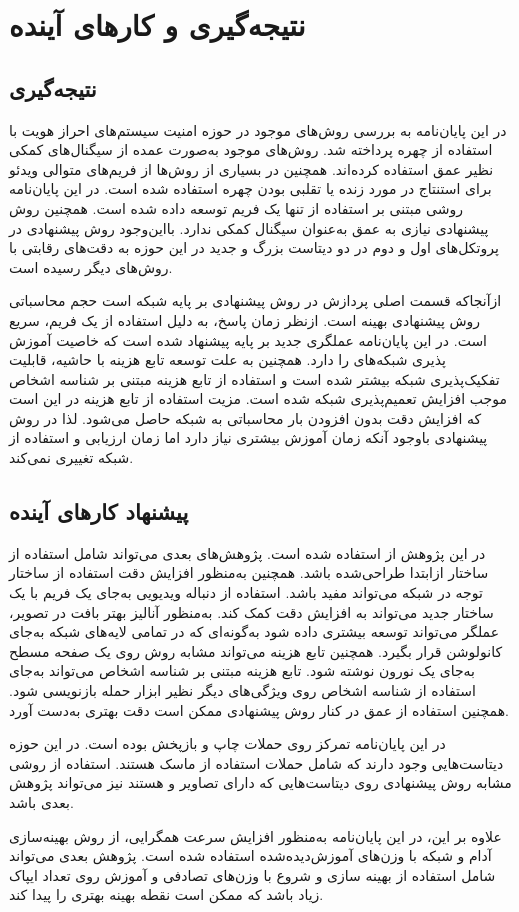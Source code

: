 \chapter{نتیجه‌گیری و کارهای آینده}
\section{نتیجه‌گیری}
در این پایان‌نامه به بررسی روش‌های موجود در حوزه امنیت سیستم‌های احراز هویت با استفاده از چهره پرداخته شد. روش‌های موجود به‌صورت عمده از سیگنال‌های کمکی نظیر عمق استفاده کرده‌اند. همچنین در بسیاری از روش‌ها از فریم‌های متوالی ویدئو برای استنتاج در مورد زنده یا تقلبی بودن چهره استفاده شده است. در این پایان‌نامه روشی مبتنی بر استفاده از تنها یک فریم توسعه داده شده است. همچنین روش پیشنهادی نیازی به عمق به‌عنوان سیگنال کمکی ندارد. با‌این‌وجود روش پیشنهادی در پروتکل‌های اول و دوم در دو دیتاست بزرگ و جدید در این حوزه به دقت‌های رقابتی با روش‌های دیگر رسیده است.

از‌آنجا‌که قسمت اصلی پردازش در روش پیشنهادی بر پایه شبکه
است حجم محاسباتی روش پیشنهادی بهینه است. از‌نظر زمان پاسخ، به دلیل استفاده از یک فریم، سریع است.
در این پایان‌نامه عملگری جدید بر پایه  پیشنهاد شده است که خاصیت آموزش پذیری شبکه‌های  را دارد. همچنین به علت توسعه تابع هزینه با حاشیه، قابلیت تفکیک‌پذیری شبکه بیشتر شده است و استفاده از تابع هزینه مبتنی بر شناسه اشخاص موجب افزایش تعمیم‌پذیری شبکه شده است. مزیت استفاده از تابع هزینه در این است که افزایش دقت بدون افزودن بار محاسباتی به شبکه حاصل می‌شود. لذا در روش پیشنهادی با‌وجود آنکه زمان آموزش بیشتری نیاز دارد اما زمان ارزیابی و استفاده از شبکه تغییری نمی‌کند.
\section{پیشنهاد کارهای آینده}
در این پژوهش از
استفاده شده است. پژوهش‌های بعدی می‌تواند شامل استفاده از ساختار از‌ابتدا طراحی‌شده باشد. همچنین به‌منظور افزایش دقت استفاده از ساختار توجه
 در شبکه می‌تواند مفید باشد. استفاده از دنباله ویدیویی به‌جای یک فریم با یک ساختار جدید می‌تواند به افزایش دقت کمک کند. به‌منظور آنالیز بهتر بافت در تصویر، عملگر  می‌تواند توسعه بیشتری داده شود به‌گونه‌ای که در تمامی لایه‌های شبکه به‌جای کانولوشن قرار بگیرد. همچنین تابع هزینه  می‌تواند مشابه روش
\cite{george2019deep}
روی یک صفحه مسطح به‌جای یک نورون نوشته شود. تابع هزینه مبتنی بر شناسه اشخاص می‌تواند به‌جای استفاده از شناسه اشخاص روی ویژگی‌های دیگر نظیر ابزار حمله بازنویسی شود. همچنین استفاده از عمق در کنار روش پیشنهادی ممکن است دقت بهتری به‌دست آورد.

در این پایان‌نامه تمرکز روی حملات چاپ و بازپخش بوده است. در این حوزه دیتاست‌هایی وجود دارند که شامل حملات استفاده از ماسک هستند. استفاده از روشی مشابه روش پیشنهادی روی دیتاست‌هایی که دارای تصاویر  و  هستند نیز می‌تواند پژوهش بعدی باشد.

علاوه بر این، در این پایان‌نامه به‌منظور افزایش سرعت همگرایی، از روش بهینه‌سازی آدام و شبکه با وزن‌های آموزش‌دیده‌شده استفاده شده است. پژوهش بعدی می‌تواند شامل استفاده از بهینه سازی  و شروع با وزن‌های تصادفی و آموزش روی تعداد ایپاک زیاد باشد که ممکن است نقطه بهینه بهتری را پیدا کند.
